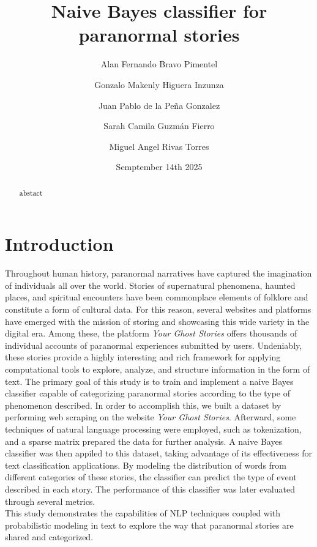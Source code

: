 \documentclass[twocolumn]{article}
\title{Naive Bayes classifier for paranormal stories}
\author{
Alan Fernando Bravo Pimentel \and
Gonzalo Makenly Higuera Inzunza \and
Juan Pablo de la Peña Gonzalez \and
Sarah Camila Guzmán Fierro \and
Miguel Angel Rivas Torres
}
\date{Semptember 14th 2025}
\begin{document}
\maketitle

\begin{abstract}
abstact
\end{abstract}

\section{Introduction}
Throughout human history, paranormal narratives have captured the imagination of individuals all over the world. Stories of supernatural phenomena, haunted places, and spiritual encounters have been commonplace elements of folklore and constitute a form of cultural data. For this reason, several websites and platforms have emerged with the mission of storing and showcasing this wide variety in the digital era. Among these, the platform \textit{Your Ghost Stories} offers thousands of individual accounts of paranormal experiences submitted by users. Undeniably, these stories provide a highly interesting and rich framework for applying computational tools to explore, analyze, and structure information in the form of text.
The primary goal of this study is to train and implement a naive Bayes classifier capable of categorizing paranormal stories according to the type of phenomenon described. In order to accomplish this, we built a dataset by performing web scraping on the website \textit{Your Ghost Stories}. Afterward, some techniques of natural language processing were employed, such as tokenization, and a sparse matrix prepared the data for further analysis. 
A naive Bayes classifier was then appiled to this dataset, taking advantage of its effectiveness for text classification applications. By modeling the distribution of words from different categories of these stories, the classifier can predict the type of event described in each story. The performance of this classifier was later evaluated through several metrics. \\
This study demonstrates the capabilities of NLP techniques coupled with probabilistic modeling in text to explore the way that paranormal stories are shared and categorized.
\end{document}
